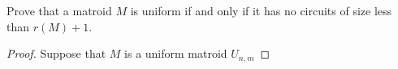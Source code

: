 \prob
{
    Prove that a matroid $M$ is uniform if and only if it has no circuits of size less than
    $r(M) + 1$.
}
\begin{proof}
	Suppose that $M$ is a uniform matroid $U_{n, m}$

\end{proof}